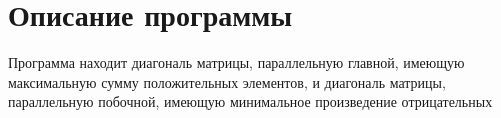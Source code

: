 \hypertarget{index_intro_sec}{}\section{Описание программы}\label{index_intro_sec}
Программа находит диагональ матрицы, параллельную главной, имеющую максимальную сумму положительных элементов, и диагональ матрицы, параллельную побочной, имеющую минимальное произведение отрицательных 